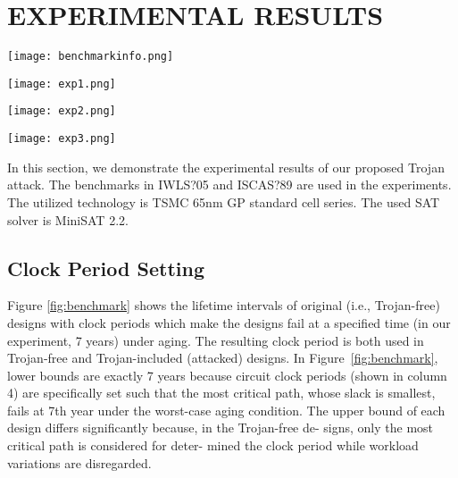 \section{EXPERIMENTAL RESULTS}
\label{sec:mot}
\begin{figure*}
	\centering
	\texttt{[image: benchmarkinfo.png]}
	\caption{Circuit information and estimated lifetime without Trojan insertion}
	\label{fig:benchmark}
\end{figure*}
\begin{figure*}
	\texttt{[image: exp1.png]}
	\caption{Lifetime distribution of s38417 instances when it is attacked to fail at 5 year and 3 year}
	\label{fig:exp1}
\end{figure*}
\begin{figure*}
	\texttt{[image: exp2.png]}
	\caption{Lifetime distribution of des\_perf instances when it is attacked to fail at 5 year and 3 year}
	\label{fig:exp2}
\end{figure*}
\begin{figure*}
	\texttt{[image: exp3.png]}
	\caption{Lifetime distribution of leo3mp instances when it is attacked to fail at 5 year and 3 year}
	\label{fig:exp3}
\end{figure*}

In this section, we demonstrate the experimental results of our proposed Trojan attack. The benchmarks in IWLS?05 and ISCAS?89 are used in the experiments. The utilized technology is TSMC 65nm GP standard cell series. The used SAT solver is MiniSAT 2.2.

\subsection{Clock Period Setting}
Figure \ref{fig:benchmark} shows the lifetime intervals of original (i.e., Trojan-free) designs with clock periods which make the designs fail at a specified time (in our experiment, 7 years) under aging. The resulting clock period is both used in Trojan-free and Trojan-included (attacked) designs. In Figure~\ref{fig:benchmark}, lower bounds are exactly 7 years because circuit clock periods (shown in column 4) are specifically set such that the most critical path, whose slack is smallest, fails at 7th year under the worst-case aging condition. The upper bound of each design differs significantly because, in the Trojan-free de- signs, only the most critical path is considered for deter- mined the clock period while workload variations are disregarded.

